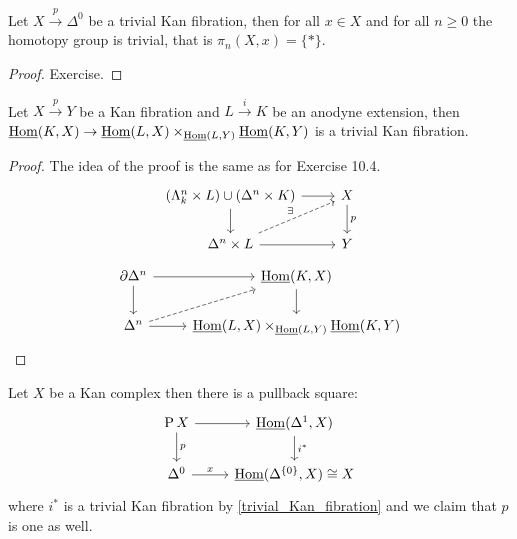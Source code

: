 \begin{prop}
    Let $X \xrightarrow{p} \Delta^0$ be a trivial Kan fibration, then for all $x \in X$ and for all $n\geq 0$ the homotopy group is trivial, that is $\pi_n(X,x)=\{*\}$.
\end{prop}

\begin{proof}
    Exercise.    
\end{proof}

\begin{prop}
    Let $X \xrightarrow{p} Y$ be a Kan fibration and $L \xrightarrow{i}K$ be an anodyne extension, then
    $\underline{\operatorname{Hom}} (K,X) \to \underline{\operatorname{Hom}}(L,X) \times_{\underline{\operatorname{Hom}}(L,Y)} \underline{\operatorname{Hom}} (K,Y) $ is a trivial Kan fibration.    
\end{prop}

\begin{proof}
    The idea of the proof is the same as for 
    Exercise 10.4.
    \[
    \begin{tikzcd}
        (\Lambda_k^n \times L) \cup (\Delta^n \times K)
        \ar[r]
        \ar[d]
        &
        X
        \ar[d, "p"]
        \\
        \Delta^n \times L 
        \ar[r]
        \ar[ru, dashed, "\exists"]
        &
        Y
    \end{tikzcd}
    \]
    \[
    \begin{tikzcd}
        \partial \Delta^n 
        \ar[r]
        \ar[d]
        &
        \underline{\Hom}(K,X)
        \ar[d]
        \\
        \Delta^n 
        \ar[r]
        \ar[ru, dashed]
        &
        \underline{\Hom}(L,X) \times_{\underline{\Hom}(L,Y)} \underline{\Hom} (K,Y)
    \end{tikzcd}
    \]
\end{proof}

\begin{cor}
    Let $X$ be a Kan complex then there is a pullback square:
    \[
    \begin{tikzcd}
        \Pathspace X
        \ar[r]
        \ar[d, "p"]
        &
        \underline{\Hom}(\Delta^1,X)
        \ar[d, "i^*"]
        \\
        \Delta^0
        \ar[r, "x"]
        &
        \underline{\Hom}(\Delta^{\{0\}},X) \cong X
    \end{tikzcd}
    \]
    where $i^*$ is a trivial Kan fibration by \cref{trivial_Kan_fibration} and we claim that $p$ is one as well.
\end{cor}

